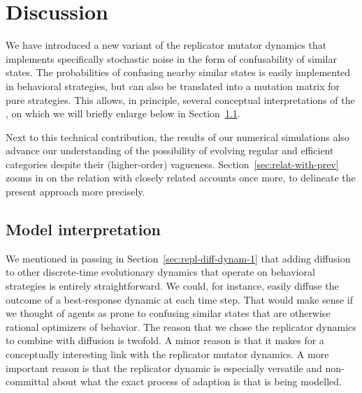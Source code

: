 \section{Discussion}
\label{sec:discussion}

We have introduced a new variant of the replicator mutator dynamics
that implements specifically stochastic noise in the form of
confusability of similar states. The probabilities of confusing nearby
similar states is easily implemented in behavioral strategies, but can
also be translated into a mutation matrix for pure strategies. This
allows, in principle, several conceptual interpretations of the \rdd,
on which we will briefly enlarge below in
Section~\ref{sec:model-interpretation}.

Next to this technical contribution, the results of our numerical
simulations also advance our understanding of the possibility of
evolving regular and efficient categories despite their (higher-order)
vagueness. Section~\ref{sec:relat-with-prev} zooms in on the relation
with closely related accounts once more, to delineate the present
approach more precisely.

\subsection{Model interpretation}
\label{sec:model-interpretation}

We mentioned in passing in Section~\ref{sec:repl-diff-dynam-1} that
adding diffusion to other discrete-time evolutionary dynamics that
operate on behavioral strategies is entirely straightforward. We
could, for instance, easily diffuse the outcome of a best-response
dynamic at each time step. That would make sense if we thought of
agents as prone to confusing similar states that are otherwise
rational optimizers of behavior. The reason that we chose the
replicator dynamics to combine with diffusion is twofold. A minor
reason is that it makes for a conceptually interesting link with the
replicator mutator dynamics. A more important reason is that the
replicator dynamic is especially versatile and non-committal about
what the exact process of adaption is that is being modelled.

